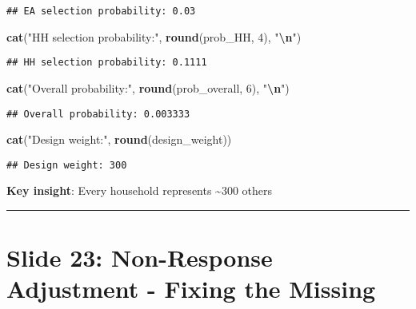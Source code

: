 \documentclass[
]{article}
\newenvironment{Shaded}{\begin{snugshade}}{\end{snugshade}}
\newcommand{\DecValTok}[1]{\textcolor[rgb]{0.00,0.00,0.81}{#1}}
\newcommand{\FunctionTok}[1]{\textcolor[rgb]{0.13,0.29,0.53}{\textbf{#1}}}
\newcommand{\NormalTok}[1]{#1}
\newcommand{\SpecialCharTok}[1]{\textcolor[rgb]{0.81,0.36,0.00}{\textbf{#1}}}
\newcommand{\StringTok}[1]{\textcolor[rgb]{0.31,0.60,0.02}{#1}}
\begin{document}
\begin{verbatim}
## EA selection probability: 0.03
\end{verbatim}

\begin{Shaded}
\begin{Highlighting}[]
\FunctionTok{cat}\NormalTok{(}\StringTok{"HH selection probability:"}\NormalTok{, }\FunctionTok{round}\NormalTok{(prob\_HH, }\DecValTok{4}\NormalTok{), }\StringTok{"}\SpecialCharTok{\textbackslash{}n}\StringTok{"}\NormalTok{)}
\end{Highlighting}
\end{Shaded}

\begin{verbatim}
## HH selection probability: 0.1111
\end{verbatim}

\begin{Shaded}
\begin{Highlighting}[]
\FunctionTok{cat}\NormalTok{(}\StringTok{"Overall probability:"}\NormalTok{, }\FunctionTok{round}\NormalTok{(prob\_overall, }\DecValTok{6}\NormalTok{), }\StringTok{"}\SpecialCharTok{\textbackslash{}n}\StringTok{"}\NormalTok{)}
\end{Highlighting}
\end{Shaded}

\begin{verbatim}
## Overall probability: 0.003333
\end{verbatim}

\begin{Shaded}
\begin{Highlighting}[]
\FunctionTok{cat}\NormalTok{(}\StringTok{"Design weight:"}\NormalTok{, }\FunctionTok{round}\NormalTok{(design\_weight))}
\end{Highlighting}
\end{Shaded}

\begin{verbatim}
## Design weight: 300
\end{verbatim}

\textbf{Key insight}: Every household represents \textasciitilde300
others

\begin{center}\rule{0.5\linewidth}{0.5pt}\end{center}

\section{Slide 23: Non-Response Adjustment - Fixing the
Missing}\label{slide-23-non-response-adjustment---fixing-the-missing}
\end{document}
